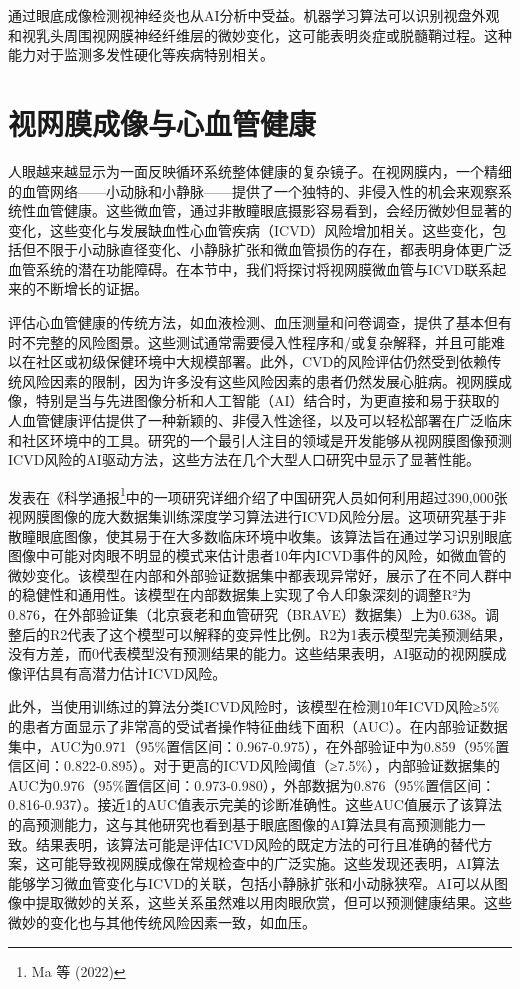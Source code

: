 \documentclass[
  Letterpaper,
]{scrbook}
\begin{document}
通过眼底成像检测视神经炎也从AI分析中受益。机器学习算法可以识别视盘外观和视乳头周围视网膜神经纤维层的微妙变化，这可能表明炎症或脱髓鞘过程。这种能力对于监测多发性硬化等疾病特别相关。

\section{视网膜成像与心血管健康}\label{ux89c6ux7f51ux819cux6210ux50cfux4e0eux5fc3ux8840ux7ba1ux5065ux5eb7}

人眼越来越显示为一面反映循环系统整体健康的复杂镜子。在视网膜内，一个精细的血管网络------小动脉和小静脉------提供了一个独特的、非侵入性的机会来观察系统性血管健康。这些微血管，通过非散瞳眼底摄影容易看到，会经历微妙但显著的变化，这些变化与发展缺血性心血管疾病（ICVD）风险增加相关。这些变化，包括但不限于小动脉直径变化、小静脉扩张和微血管损伤的存在，都表明身体更广泛血管系统的潜在功能障碍。在本节中，我们将探讨将视网膜微血管与ICVD联系起来的不断增长的证据。

评估心血管健康的传统方法，如血液检测、血压测量和问卷调查，提供了基本但有时不完整的风险图景。这些测试通常需要侵入性程序和/或复杂解释，并且可能难以在社区或初级保健环境中大规模部署。此外，CVD的风险评估仍然受到依赖传统风险因素的限制，因为许多没有这些风险因素的患者仍然发展心脏病。视网膜成像，特别是当与先进图像分析和人工智能（AI）结合时，为更直接和易于获取的人血管健康评估提供了一种新颖的、非侵入性途径，以及可以轻松部署在广泛临床和社区环境中的工具。研究的一个最引人注目的领域是开发能够从视网膜图像预测ICVD风险的AI驱动方法，这些方法在几个大型人口研究中显示了显著性能。

发表在《科学通报\footnote{Ma 等 (2022)}中的一项研究详细介绍了中国研究人员如何利用超过390,000张视网膜图像的庞大数据集训练深度学习算法进行ICVD风险分层。这项研究基于非散瞳眼底图像，使其易于在大多数临床环境中收集。该算法旨在通过学习识别眼底图像中可能对肉眼不明显的模式来估计患者10年内ICVD事件的风险，如微血管的微妙变化。该模型在内部和外部验证数据集中都表现异常好，展示了在不同人群中的稳健性和通用性。该模型在内部数据集上实现了令人印象深刻的调整R²为0.876，在外部验证集（北京衰老和血管研究（BRAVE）数据集）上为0.638。调整后的R2代表了这个模型可以解释的变异性比例。R2为1表示模型完美预测结果，没有方差，而0代表模型没有预测结果的能力。这些结果表明，AI驱动的视网膜成像评估具有高潜力估计ICVD风险。

此外，当使用训练过的算法分类ICVD风险时，该模型在检测10年ICVD风险≥5\%的患者方面显示了非常高的受试者操作特征曲线下面积（AUC）。在内部验证数据集中，AUC为0.971（95\%置信区间：0.967-0.975），在外部验证中为0.859（95\%置信区间：0.822-0.895）。对于更高的ICVD风险阈值（≥7.5\%），内部验证数据集的AUC为0.976（95\%置信区间：0.973-0.980），外部数据为0.876（95\%置信区间：0.816-0.937）。接近1的AUC值表示完美的诊断准确性。这些AUC值展示了该算法的高预测能力，这与其他研究也看到基于眼底图像的AI算法具有高预测能力一致。结果表明，该算法可能是评估ICVD风险的既定方法的可行且准确的替代方案，这可能导致视网膜成像在常规检查中的广泛实施。这些发现还表明，AI算法能够学习微血管变化与ICVD的关联，包括小静脉扩张和小动脉狭窄。AI可以从图像中提取微妙的关系，这些关系虽然难以用肉眼欣赏，但可以预测健康结果。这些微妙的变化也与其他传统风险因素一致，如血压。
\end{document}
